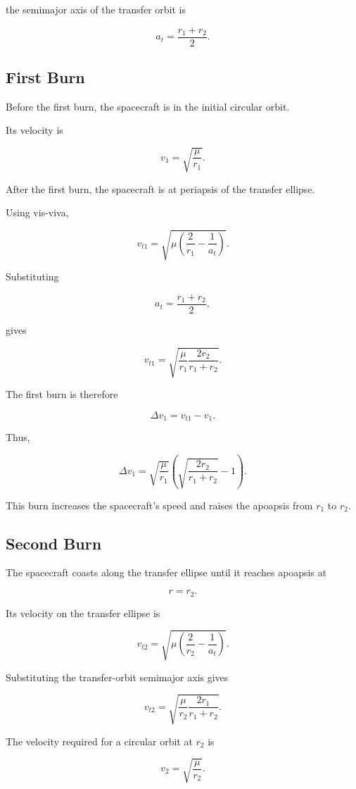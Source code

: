\documentclass{article}
\begin{document}
the semimajor axis of the transfer orbit is

\[
\boxed{
a_t
=
\frac{r_1+r_2}{2}
}.
\]


\subsection{First Burn}

Before the first burn, the spacecraft is in the initial circular orbit.

Its velocity is

\[
v_1
=
\sqrt{\frac{\mu}{r_1}}.
\]

After the first burn, the spacecraft is at periapsis of the transfer ellipse.

Using vis-viva,

\[
v_{t1}
=
\sqrt{
\mu
\left(
\frac{2}{r_1}
-
\frac{1}{a_t}
\right)
}.
\]

Substituting

\[
a_t
=
\frac{r_1+r_2}{2},
\]

gives

\[
v_{t1}
=
\sqrt{
\frac{\mu}{r_1}
\frac{2r_2}{r_1+r_2}
}.
\]

The first burn is therefore

\[
\Delta v_1
=
v_{t1}-v_1.
\]

Thus,

\[
\boxed{
\Delta v_1
=
\sqrt{\frac{\mu}{r_1}}
\left(
\sqrt{\frac{2r_2}{r_1+r_2}}
-
1
\right)
}.
\]

This burn increases the spacecraft's speed and raises the apoapsis from \(r_1\) to \(r_2\).


\subsection{Second Burn}

The spacecraft coasts along the transfer ellipse until it reaches apoapsis at

\[
r=r_2.
\]

Its velocity on the transfer ellipse is

\[
v_{t2}
=
\sqrt{
\mu
\left(
\frac{2}{r_2}
-
\frac{1}{a_t}
\right)
}.
\]

Substituting the transfer-orbit semimajor axis gives

\[
v_{t2}
=
\sqrt{
\frac{\mu}{r_2}
\frac{2r_1}{r_1+r_2}
}.
\]

The velocity required for a circular orbit at \(r_2\) is

\[
v_2
=
\sqrt{\frac{\mu}{r_2}}.
\]
\end{document}
